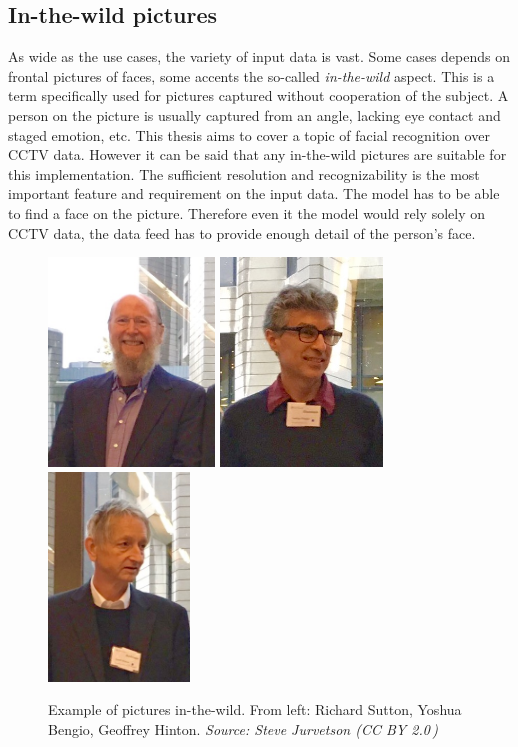 \subsection{In-the-wild pictures}

As wide as the use cases, the variety of input data is vast. Some cases depends on frontal pictures of faces, some accents the so-called \textit{in-the-wild} aspect. This is a term specifically used for pictures captured without cooperation of the subject. A person on the picture is usually captured from an angle, lacking eye contact and staged emotion, etc. This thesis aims to cover a topic of facial recognition over CCTV data. However it can be said that any in-the-wild pictures are suitable for this implementation. The sufficient resolution and recognizability is the most important feature and requirement on the input data. The model has to be able to find a face on the picture. Therefore even it the model would rely solely on CCTV data, the data feed has to provide enough detail of the person's face.

\begin{figure}[ht]
    \centering
    \includegraphics[height=15em]{obrazky-figures/richard_sutton.jpg}
    \includegraphics[height=15em]{obrazky-figures/yoshua_bengio.jpg}
    \includegraphics[height=15em]{obrazky-figures/geoffrey_hinton.jpg}
    \caption[Example of pictures in{-}the{-}wild]{Example of pictures in{-}the{-}wild. From left: Richard Sutton, Yoshua Bengio, Geoffrey Hinton. \textit{Source: Steve Jurvetson (CC BY 2.0\,\footnotemark)}}
\end{figure}

